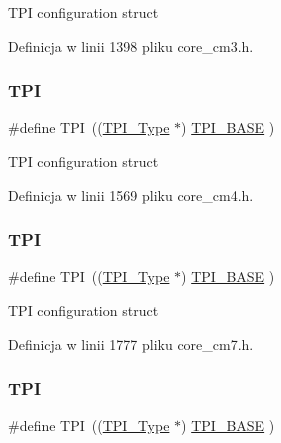 T\+PI configuration struct 

Definicja w linii 1398 pliku core\+\_\+cm3.\+h.

\mbox{\label{group___c_m_s_i_s__core__base_ga8b4dd00016aed25a0ea54e9a9acd1239}} 
\subsubsection{\texorpdfstring{T\+PI}{TPI}\hspace{0.1cm}{\footnotesize\ttfamily [5/8]}}
{\footnotesize\ttfamily \#define T\+PI~((\hyperlink{struct_t_p_i___type}{T\+P\+I\+\_\+\+Type}       $\ast$)     \hyperlink{group___c_m_s_i_s__core__base_ga2b1eeff850a7e418844ca847145a1a68}{T\+P\+I\+\_\+\+B\+A\+SE}      )}

T\+PI configuration struct 

Definicja w linii 1569 pliku core\+\_\+cm4.\+h.

\mbox{\label{group___c_m_s_i_s__core__base_ga8b4dd00016aed25a0ea54e9a9acd1239}} 
\subsubsection{\texorpdfstring{T\+PI}{TPI}\hspace{0.1cm}{\footnotesize\ttfamily [6/8]}}
{\footnotesize\ttfamily \#define T\+PI~((\hyperlink{struct_t_p_i___type}{T\+P\+I\+\_\+\+Type}       $\ast$)     \hyperlink{group___c_m_s_i_s__core__base_ga2b1eeff850a7e418844ca847145a1a68}{T\+P\+I\+\_\+\+B\+A\+SE}      )}

T\+PI configuration struct 

Definicja w linii 1777 pliku core\+\_\+cm7.\+h.

\mbox{\label{group___c_m_s_i_s__core__base_ga8b4dd00016aed25a0ea54e9a9acd1239}} 
\subsubsection{\texorpdfstring{T\+PI}{TPI}\hspace{0.1cm}{\footnotesize\ttfamily [7/8]}}
{\footnotesize\ttfamily \#define T\+PI~((\hyperlink{struct_t_p_i___type}{T\+P\+I\+\_\+\+Type}       $\ast$)     \hyperlink{group___c_m_s_i_s__core__base_ga2b1eeff850a7e418844ca847145a1a68}{T\+P\+I\+\_\+\+B\+A\+SE}         )}

